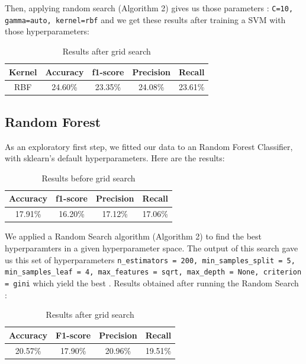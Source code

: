 \documentclass[twocolumn]{article}
\begin{document}
Then, applying random search (Algorithm 2) gives us those parameters : \texttt{C=10, gamma=auto, kernel=rbf} and we get these results after training a SVM with those hyperparameters:


\begin{table}[h]
    \centering
    \begin{tabular}{|c|c|c|c|c|}
    \hline
      Kernel & Accuracy & f1-score & Precision & Recall \\
      \hline
      RBF & 24.60\% & 23.35\% & 24.08\% & 23.61\% \\
    \hline
    \end{tabular}

    \label{tab:my_label}
    \caption{Results after grid search}
\end{table}

\subsection{Random Forest}
As an exploratory first step, we fitted our data to an Random Forest Classifier, with sklearn's default hyperparameters. Here are the results:

\begin{table}[h]
    \centering
    \begin{tabular}{|c|c|c|c|}
    \hline
      Accuracy & f1-score & Precision & Recall \\
      \hline
      17.91\% & 16.20\% & 17.12\% & 17.06\% \\
    \hline
    \end{tabular}

    \label{tab:my_label}
    \caption{Results before grid search}
\end{table}

We applied a Random Search algorithm (Algorithm 2) to find the best hyperparamters in a given hyperparameter space. The output of this search gave us this set of hyperparameters \texttt{n\_estimators = 200, min\_samples\_split = 5, min\_samples\_leaf = 4, max\_features = sqrt, max\_depth = None, criterion = gini} which yield the best . Results obtained after running the Random Search : 

\begin{table}[h]
    \centering
    \begin{tabular}{|c|c|c|c|}
        \hline
         Accuracy & F1-score & Precision & Recall\\
        \hline
         20.57\% & 17.90\% & 20.96\% & 19.51\%\\
        \hline
    \end{tabular}
    
    \label{tab:my_label}
    \caption{Results after grid search}
\end{table}
\end{document}
